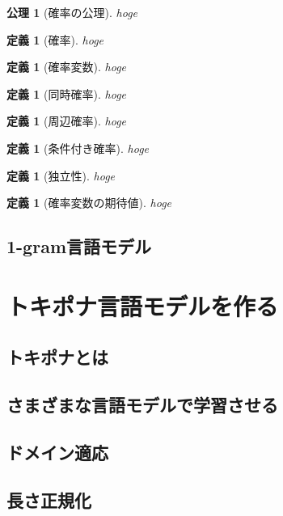 \documentclass[11pt]{report}
\newtheorem{definition}[theorem]{定義}
\newtheorem{axiom}[theorem]{公理}
\begin{document}
\begin{axiom}[確率の公理]
	hoge
\end{axiom}

\begin{definition}[確率]
	hoge
\end{definition}

\begin{definition}[確率変数]
	hoge
\end{definition}


\begin{definition}[同時確率]
	hoge
\end{definition}

\begin{definition}[周辺確率]
	hoge
\end{definition}

\begin{definition}[条件付き確率]
	hoge
\end{definition}

\begin{definition}[独立性]
	hoge
\end{definition}

\begin{definition}[確率変数の期待値]
	hoge
\end{definition}

\section{1-gram言語モデル}

\chapter{トキポナ言語モデルを作る}

\section{トキポナとは}

\section{さまざまな言語モデルで学習させる}

\section{ドメイン適応}

\section{長さ正規化}
\end{document}
